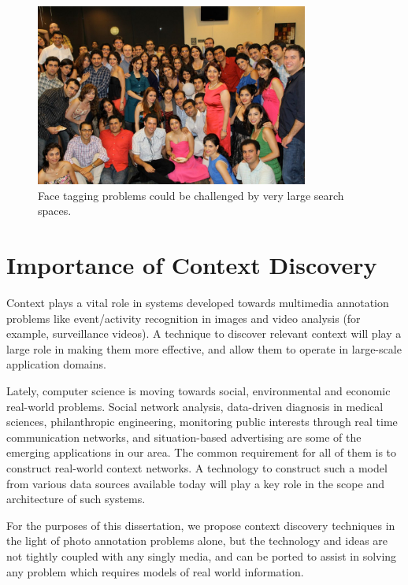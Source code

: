 \begin{figure}[t]
\centering
\includegraphics[width=0.8\textwidth]{media/chapter1/setarehetal}
\caption{Face tagging problems could be challenged by very large search spaces.}
\label{fig:people}
\end{figure}

\section{Importance of Context Discovery}

Context plays a vital role in systems developed towards multimedia annotation problems like event/activity recognition in images and video analysis (for example, surveillance videos). A technique to discover relevant context will play a large role in making them more effective, and allow them to operate in large-scale application domains.

Lately, computer science is moving towards social, environmental and economic real-world problems. Social network analysis, data-driven diagnosis in medical sciences, philanthropic engineering, monitoring public interests through real time communication networks, and situation-based advertising are some of the emerging applications in our area. The common requirement for all of them is to construct real-world context networks. A technology to construct such a model from various data sources available today will play a key role in the scope and architecture of such systems.

For the purposes of this dissertation, we propose context discovery techniques in the light of photo annotation problems alone, but the technology and ideas are not tightly coupled with any singly media, and can be ported to assist in solving any problem which requires models of real world information.

